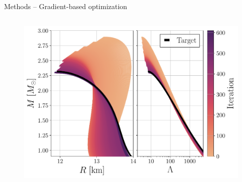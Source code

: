 \documentclass[usenames,dvipsnames,t]{beamer}
\begin{document}
\begin{frame}{Methods -- Gradient-based optimization}
\begin{columns}
    \begin{figure}[htpb]
      \centering
      \includegraphics[width=1.0\linewidth]{Figures/showcase_variational_inference.pdf}
    \end{figure}

  \end{columns}
\end{frame}
\end{document}

